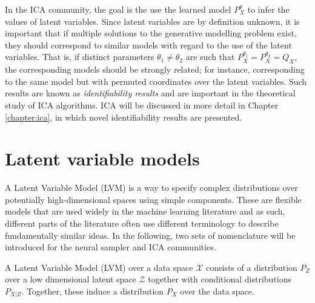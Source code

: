 In the ICA community, the goal is the use the learned model $P_X^\theta$ to infer the values of latent variables. 
Since latent variables are by definition unknown, it is important that if multiple solutions to the generative modelling problem exist, they should correspond to similar models with regard to the use of the latent variables.
That is, if distinct parameters $\theta_1 \not= \theta_2$ are such that  $P_X^{\theta_1} = P_X^{\theta_2} = Q_X$, the corresponding models should be strongly related; for instance, corresponding to the same model but with permuted coordinates over the latent variables.
Such results are known as \emph{identifiability results} and are important in the theoretical study of ICA algorithms. 
ICA will be discussed in more detail in Chapter \ref{chapter:ica}, in which novel identifiability results are presented.



\section{Latent variable models}\label{sec:literature-lvms}

A Latent Variable Model (LVM) is a way to specify complex distributions over potentially high-dimensional spaces using simple components. 
These are flexible models that are used widely in the machine learning literature and as such, different parts of the literature often use different terminology to describe fundamentally similar ideas.
In the following, two sets of nomenclature will be introduced for the neural sampler and ICA communities.

\medskip

\begin{definition}
A Latent Variable Model (LVM) over a data space $\mathcal{X}$ consists of a distribution $P_Z$ over a low dimensional latent space $\mathcal{Z}$ together with conditional distributions $P_{X|Z}$. 
Together, these induce a distribution $P_X$ over the data space. 
\end{definition}



